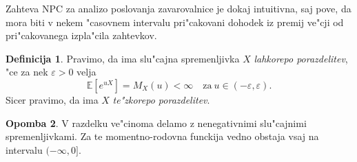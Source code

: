 \documentclass[12pt, a4paper, reqno]{amsart}
\theoremstyle{definition}
\newtheorem{definicija}{Definicija}[section]
\newtheorem{opomba}[definicija]{Opomba}
\theoremstyle{plain}
\newcommand{\E}{\mathbb{E}}
\newcommand{\1}{\mathds{1}}
\begin{document}
        Zahteva NPC za analizo poslovanja zavarovalnice je dokaj intuitivna, saj pove, da mora  
        biti v nekem "casovnem intervalu pri"cakovani dohodek iz premij ve"cji od pri"cakovanega izpla"cila zahtevkov.

        \begin{definicija}
            Pravimo, da ima slu"cajna spremenljivka $X$ \textit{lahkorepo porazdelitev}, "ce za 
            nek $\varepsilon > 0$ velja
        \begin{equation*}
            \E\left[e^{uX}\right] = M_X(u) < \infty \quad \text{za} \ u \in (-\varepsilon, \varepsilon).
        \end{equation*}
        Sicer pravimo, 
        da ima $X$ \textit{te"zkorepo porazdelitev}.
        \label{def:lahkorepnaPorazdelitev}
        \end{definicija}

        \begin{opomba}
            V razdelku ve"cinoma delamo z nenegativnimi slu"cajnimi spremenljivkami. Za te momentno-rodovna 
            funckija vedno obstaja vsaj na intervalu $(-\infty, 0]$.
        \end{opomba}
\end{document}
